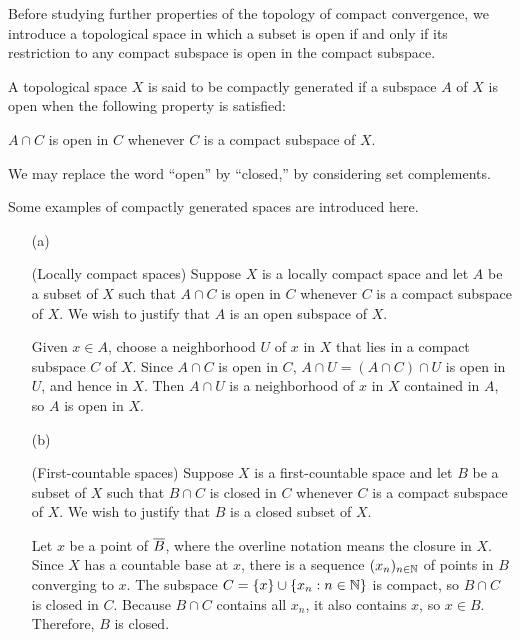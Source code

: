 Before studying further properties of the topology of compact convergence, we introduce a topological space in which a subset is open if and only if its restriction to any compact subspace is open in the compact subspace.
\begin{defi}
    A topological space $X$ is said to be compactly generated if a subspace $A$ of $X$ is open when the following property is satisfied:
    \begin{center}
        $A\cap C$ is open in $C$ whenever $C$ is a compact subspace of $X$.
    \end{center}
\end{defi}
\begin{rmk}
    We may replace the word ``open'' by ``closed,'' by considering set complements.
\end{rmk}
\begin{exmp}
    Some examples of compactly generated spaces are introduced here.
    \begin{enumerate}
        \item[(a)]
        {
            (Locally compact spaces)
            Suppose $X$ is a locally compact space and let $A$ be a subset of $X$ such that $A\cap C$ is open in $C$ whenever $C$ is a compact subspace of $X$.
            We wish to justify that $A$ is an open subspace of $X$.

            Given $x\in A$, choose a neighborhood $U$ of $x$ in $X$ that lies in a compact subspace $C$ of $X$.
            Since $A\cap C$ is open in $C$, $A\cap U=(A\cap C)\cap U$ is open in $U$, and hence in $X$.
            Then $A\cap U$ is a neighborhood of $x$ in $X$ contained in $A$, so $A$ is open in $X$.
        }
        \item[(b)]
        {
            (First-countable spaces)
            Suppose $X$ is a first-countable space and let $B$ be a subset of $X$ such that $B\cap C$ is closed in $C$ whenever $C$ is a compact subspace of $X$.
            We wish to justify that $B$ is a closed subset of $X$.

            Let $x$ be a point of $\overline{B}$, where the overline notation means the closure in $X$.
            Since $X$ has a countable base at $x$, there is a sequence $(x_n)_{n\in{\mathbb{N}}}$ of points in $B$ converging to $x$.
            The subspace $C=\{x\}\cup\{x_n: n\in{\mathbb{N}}\}$ is compact, so $B\cap C$ is closed in $C$.
            Because $B\cap C$ contains all $x_n$, it also contains $x$, so $x\in B$.
            Therefore, $B$ is closed.
        }
    \end{enumerate}
\end{exmp}


